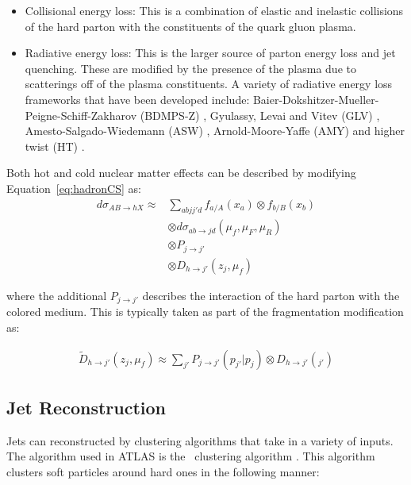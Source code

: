 \begin{itemize}
\item Collisional energy loss: This is a combination of elastic and inelastic collisions of the hard parton with the constituents of the quark gluon plasma.

\item Radiative energy loss: This is the larger source of parton energy loss and jet quenching.
These are modified by the presence of the plasma due to scatterings off of the plasma constituents.
A variety of radiative energy loss frameworks that have been developed include: Baier-Dokshitzer-Mueller-Peigne-Schiff-Zakharov (BDMPS-Z) \cite{BAIER1997291}, Gyulassy, Levai and Vitev (GLV) \cite{Gyulassy:1999zd}, Amesto-Salgado-Wiedemann (ASW) \cite{Wiedemann:2000za},  Arnold-Moore-Yaffe (AMY) \cite{Arnold:2001ba} and higher twist (HT) \cite{Guo:2000nz}.
\end{itemize}

Both hot and cold nuclear matter effects can be described by modifying Equation~\ref{eq:hadronCS} as:
\begin{align}
d \sigma_{AB \rightarrow hX}  \approx & \sum_{abjj'd} f_{a/A} (x_a) \otimes f_{b/B} (x_b) \\ 
& \otimes d\sigma_{ab\rightarrow jd} (\mu_f, \mu_F, \mu_R)  \nonumber \\
& \otimes P_{j\rightarrow j'} \nonumber \\
& \otimes D_{h \rightarrow j'} (z_j, \mu_f) \nonumber 
\end{align}

where the additional $P_{j\rightarrow j'}$ describes the interaction of the hard parton with the colored medium.
This is typically taken as part of the fragmentation modification as:

\begin{align}
\widetilde{D}_{h \rightarrow j'} (z_j, \mu_f) \approx \sum_{j'} P_{j\rightarrow j'} (p_{j'} | p_j) \otimes D_{h\rightarrow j'} (_{j'})
\end{align}

\subsection{Jet Reconstruction}
Jets can reconstructed by clustering algorithms that take in a variety of inputs.
The algorithm used in ATLAS is the \antikt\ clustering algorithm \cite{Cacciari:2008gp}.
This algorithm clusters soft particles around hard ones in the following manner:

